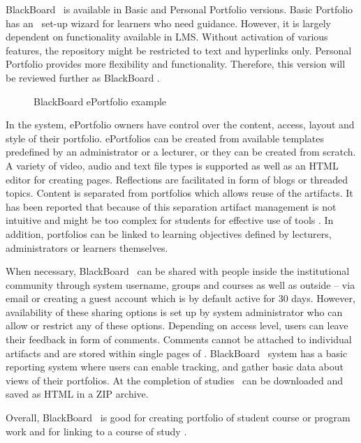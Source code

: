 BlackBoard \ep~is available in Basic and Personal Portfolio versions. Basic
Portfolio has an \ep~set-up wizard for learners who need guidance. However, it
is largely dependent on functionality available in LMS. Without activation of
various features, the repository might be restricted to text and hyperlinks
only. Personal Portfolio provides more flexibility and functionality. Therefore,
this version will be reviewed further as BlackBoard \ep.

\begin{figure}[htb]
\centering 
\setlength\fboxsep{0pt}
\setlength\fboxrule{0.5pt}
\fbox{\texttt{[image: CH4-F6-BB]}}
\caption[BlackBoard ePortfolio example]{BlackBoard ePortfolio example
\citep{UniversityofTorontoScarborough2010}}
\label{fig:bbep}
\end{figure}

In the system, ePortfolio owners have control over the content, access, layout
and style of their portfolio. ePortfolios can be created from available
templates predefined by an administrator or a lecturer, or they can be created
from scratch. A variety of video, audio and text file types is supported as well
as an HTML editor for creating pages. Reflections are facilitated in form of
blogs or threaded topics. Content is separated from portfolios which allows
reuse of the artifacts. It has been reported that because of this separation
artifact management is not intuitive and might be too complex for students for
effective use of tools \citep{Clark2009}. In addition, portfolios can be linked
to learning objectives defined by lecturers, administrators or learners
themselves.

When necessary, BlackBoard \ep~can be shared with people inside the
institutional community through system username, groups and courses as well as
outside -- via email or creating a guest account which is by default active for
30 days. However, availability of these sharing options is set up by system
administrator who can allow or restrict any of these options. Depending on
access level, users can leave their feedback in form of comments. Comments
cannot be attached to individual artifacts and are stored within single pages of
\ep. BlackBoard \ep~system has a basic reporting system where users can enable
tracking, and gather basic data about views of their portfolios. At the
completion of studies \ep~can be downloaded and saved as HTML in a ZIP archive.

Overall, BlackBoard \ep~is good for creating portfolio of student course or
program work and for linking to a course of study
\citep{UniversityofTorontoScarborough2010}. 

